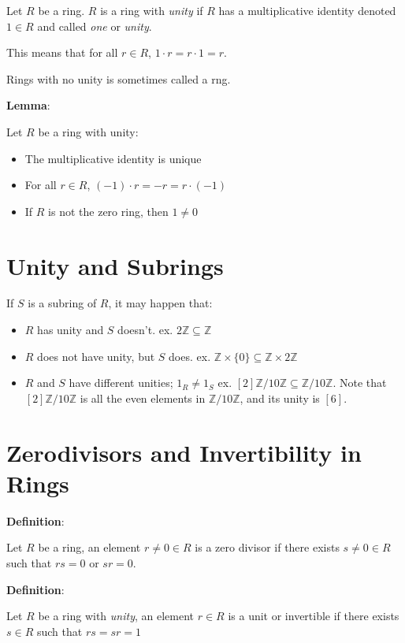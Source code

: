 \documentclass{article}
\begin{document}
\begin{multicols*}{2}
Let $R$ be a ring. $R$ is a ring with \textit{unity} if $R$ has a multiplicative identity denoted $1 \in R$ and called \textit{one} or \textit{unity}.

This means that for all $r \in R$, $1 \cdot r = r \cdot 1 = r$.

Rings with no unity is sometimes called a rng.

\textbf{Lemma}:

Let $R$ be a ring with unity:

\begin{itemize}
    \item The multiplicative identity is unique
    \item For all $r \in R$, $(-1) \cdot r = -r = r \cdot (-1)$
    \item If $R$ is not the zero ring, then $1 \neq 0$
\end{itemize}

\section{Unity and Subrings}

If $S$ is a subring of $R$, it may happen that:

\begin{itemize}
    \item $R$ has unity and $S$ doesn't. 
    \subitem ex. $2 \mathbb{Z} \subseteq \mathbb{Z}$
    \item $R$ does not have unity, but $S$ does. 
    \subitem ex. $\mathbb{Z} \times \{0\} \subseteq \mathbb{Z} \times 2\mathbb{Z}$
    \item $R$ and $S$ have different unities; $1_R \neq 1_S$
    \subitem ex. $[2]\mathbb{Z}/10\mathbb{Z} \subseteq \mathbb{Z}/10\mathbb{Z}$.
    \subitem Note that $[2]\mathbb{Z}/10\mathbb{Z}$ is all the even elements in $\mathbb{Z}/10\mathbb{Z}$, and its unity is $[6]$.
\end{itemize}

\section{Zerodivisors and Invertibility in Rings}

\textbf{Definition}:

Let $R$ be a ring, an element $r \neq 0 \in R$ is a zero divisor if there exists $s \neq 0 \in R$ such that $rs = 0$ or $sr = 0$.

\textbf{Definition}:

Let $R$ be a ring with \textit{unity}, an element $r \in R$ is a unit or invertible if there exists $s \in R$ such that $rs = sr = 1$


\end{multicols*}
\end{document}
